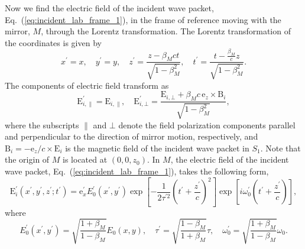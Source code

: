 \documentclass[10pt, a4paper, twoside, openright]{report}
\renewcommand{\vec}[1]{\boldsymbol{\mathrm{#1}}}
\begin{document}
Now we find the electric field of the incident wave packet, Eq.~(\ref{eq:incident_lab_frame_1}), in the frame of reference moving with the mirror, $ M $, through the Lorentz transformation. The Lorentz transformation of the coordinates is given by
\begin{equation}\label{eq:lorentz_transform_coords}
x^{\prime} = x, \quad y^{\prime} = y, \quad z^{\prime} = \frac{z - \beta_M c t}{\sqrt{1 - \beta_M^2}}, \quad t^{\prime} = \frac{t - \frac{\beta_M}{c} z}{\sqrt{1 - \beta_M^2}}.
\end{equation}
The components of electric field transform as
\begin{equation}\label{eq:lorentz_transform_fields}
\vec{E}^{\prime}_{i, \parallel} = \vec{E}_{i, \parallel}, \quad \vec{E}^{\prime}_{i, \bot} = \frac{\vec{E}_{i, \bot} + \beta_M c \, \vec{e}_z \times \vec{B}_{i}}{\sqrt{1 - \beta_M^2}},
\end{equation}
where the subscripts $ \parallel $ and $ \bot $ denote the field polarization components parallel and perpendicular to the direction of mirror motion, respectively, and $ \vec{B}_{i} = -\vec{e}_z / c \times \vec{E}_i $ is the magnetic field of the incident wave packet in $ S_1 $. Note that the origin of $ M $ is located at $ \left( 0, 0, z_0 \right) $. In $ M $, the electric field of the incident wave packet, Eq.~(\ref{eq:incident_lab_frame_1}), takes the following form,
\begin{equation}\label{eq:incident_boost_frame}
\vec{E}^{\prime}_i \left(x^{\prime}, y^{\prime}, z^{\prime}; t^{\prime} \right) = \vec{e}_x^{\prime} E^{\prime}_0 \left(x^{\prime}, y^{\prime} \right) \exp \left[ - \frac{1}{2 \tau^{\prime 2}} \left(t^{\prime} + \frac{z^{\prime}}{c}\right)^2 \right] \exp \left[ i \omega_0^{\prime} \left(t^{\prime} + \frac{z^{\prime}}{c}\right) \right],
\end{equation}
where
\begin{equation}\label{eq:coeff_boost}
E^{\prime}_0 \left(x^{\prime}, y^{\prime} \right) = \sqrt{\frac{1 + \beta_M}{1 - \beta_M}} E_0 \left(x, y \right), \quad \tau^{\prime} = \sqrt{\frac{1 - \beta_M}{1 + \beta_M}} \tau, \quad \omega_0^{\prime} = \sqrt{\frac{1 + \beta_M}{1 - \beta_M}} \omega_0.
\end{equation}
\end{document}
